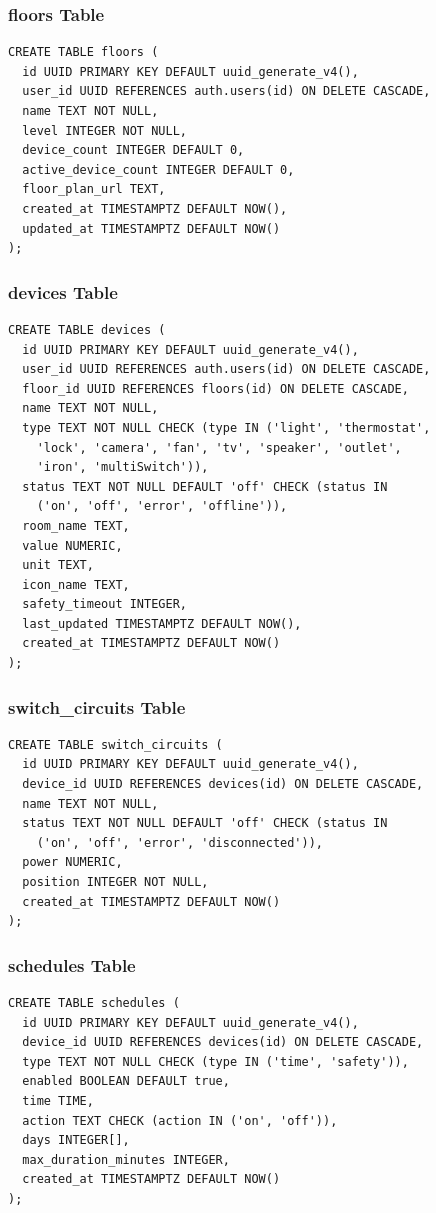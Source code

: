\documentclass[12pt,a4paper]{article}
\begin{document}
\subsubsection{floors Table}
\begin{verbatim}
CREATE TABLE floors (
  id UUID PRIMARY KEY DEFAULT uuid_generate_v4(),
  user_id UUID REFERENCES auth.users(id) ON DELETE CASCADE,
  name TEXT NOT NULL,
  level INTEGER NOT NULL,
  device_count INTEGER DEFAULT 0,
  active_device_count INTEGER DEFAULT 0,
  floor_plan_url TEXT,
  created_at TIMESTAMPTZ DEFAULT NOW(),
  updated_at TIMESTAMPTZ DEFAULT NOW()
);
\end{verbatim}

\subsubsection{devices Table}
\begin{verbatim}
CREATE TABLE devices (
  id UUID PRIMARY KEY DEFAULT uuid_generate_v4(),
  user_id UUID REFERENCES auth.users(id) ON DELETE CASCADE,
  floor_id UUID REFERENCES floors(id) ON DELETE CASCADE,
  name TEXT NOT NULL,
  type TEXT NOT NULL CHECK (type IN ('light', 'thermostat', 
    'lock', 'camera', 'fan', 'tv', 'speaker', 'outlet', 
    'iron', 'multiSwitch')),
  status TEXT NOT NULL DEFAULT 'off' CHECK (status IN 
    ('on', 'off', 'error', 'offline')),
  room_name TEXT,
  value NUMERIC,
  unit TEXT,
  icon_name TEXT,
  safety_timeout INTEGER,
  last_updated TIMESTAMPTZ DEFAULT NOW(),
  created_at TIMESTAMPTZ DEFAULT NOW()
);
\end{verbatim}

\subsubsection{switch\_circuits Table}
\begin{verbatim}
CREATE TABLE switch_circuits (
  id UUID PRIMARY KEY DEFAULT uuid_generate_v4(),
  device_id UUID REFERENCES devices(id) ON DELETE CASCADE,
  name TEXT NOT NULL,
  status TEXT NOT NULL DEFAULT 'off' CHECK (status IN 
    ('on', 'off', 'error', 'disconnected')),
  power NUMERIC,
  position INTEGER NOT NULL,
  created_at TIMESTAMPTZ DEFAULT NOW()
);
\end{verbatim}


\subsubsection{schedules Table}
\begin{verbatim}
CREATE TABLE schedules (
  id UUID PRIMARY KEY DEFAULT uuid_generate_v4(),
  device_id UUID REFERENCES devices(id) ON DELETE CASCADE,
  type TEXT NOT NULL CHECK (type IN ('time', 'safety')),
  enabled BOOLEAN DEFAULT true,
  time TIME,
  action TEXT CHECK (action IN ('on', 'off')),
  days INTEGER[],
  max_duration_minutes INTEGER,
  created_at TIMESTAMPTZ DEFAULT NOW()
);
\end{verbatim}
\end{document}
